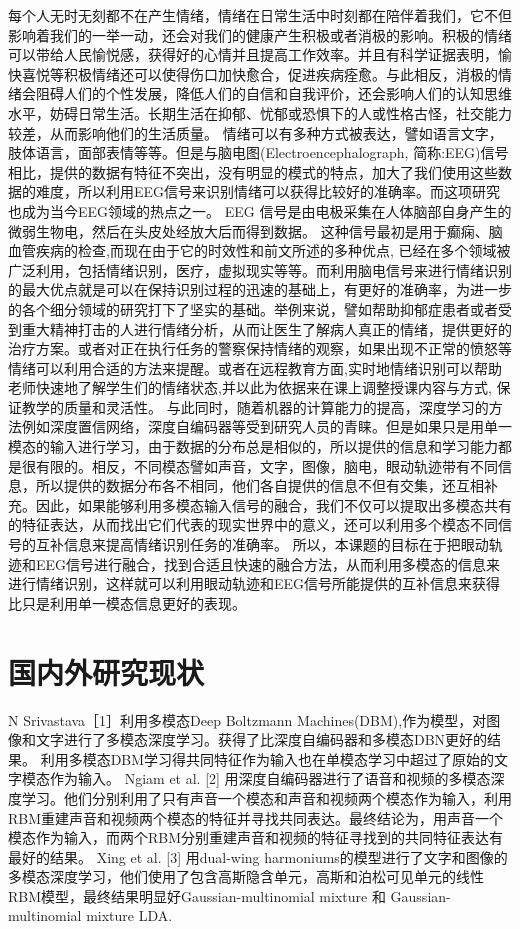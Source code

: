 	每个人无时无刻都不在产生情绪，情绪在日常生活中时刻都在陪伴着我们，它不但影响着我们的一举一动，还会对我们的健康产生积极或者消极的影响。积极的情绪可以带给人民愉悦感，获得好的心情并且提高工作效率。并且有科学证据表明，愉快喜悦等积极情绪还可以使得伤口加快愈合，促进疾病痊愈。与此相反，消极的情绪会阻碍人们的个性发展，降低人们的自信和自我评价，还会影响人们的认知思维水平，妨碍日常生活。长期生活在抑郁、忧郁或恐惧下的人或性格古怪，社交能力较差，从而影响他们的生活质量。
	情绪可以有多种方式被表达，譬如语言文字，肢体语言，面部表情等等。但是与脑电图(Electroencephalograph, 简称:EEG)信号相比，提供的数据有特征不突出，没有明显的模式的特点，加大了我们使用这些数据的难度，所以利用EEG信号来识别情绪可以获得比较好的准确率。而这项研究也成为当今EEG领域的热点之一。
	EEG 信号是由电极采集在人体脑部自身产生的微弱生物电，然后在头皮处经放大后而得到数据。 这种信号最初是用于癫痫、脑血管疾病的检查,而现在由于它的时效性和前文所述的多种优点, 已经在多个领域被广泛利用，包括情绪识别，医疗，虚拟现实等等。而利用脑电信号来进行情绪识别的最大优点就是可以在保持识别过程的迅速的基础上，有更好的准确率，为进一步的各个细分领域的研究打下了坚实的基础。举例来说，譬如帮助抑郁症患者或者受到重大精神打击的人进行情绪分析，从而让医生了解病人真正的情绪，提供更好的治疗方案。或者对正在执行任务的警察保持情绪的观察，如果出现不正常的愤怒等情绪可以利用合适的方法来提醒。或者在远程教育方面,实时地情绪识别可以帮助老师快速地了解学生们的情绪状态,并以此为依据来在课上调整授课内容与方式, 保证教学的质量和灵活性。
	与此同时，随着机器的计算能力的提高，深度学习的方法例如深度置信网络，深度自编码器等受到研究人员的青睐。但是如果只是用单一模态的输入进行学习，由于数据的分布总是相似的，所以提供的信息和学习能力都是很有限的。相反，不同模态譬如声音，文字，图像，脑电，眼动轨迹带有不同信息，所以提供的数据分布各不相同，他们各自提供的信息不但有交集，还互相补充。因此，如果能够利用多模态输入信号的融合，我们不仅可以提取出多模态共有的特征表达，从而找出它们代表的现实世界中的意义，还可以利用多个模态不同信号的互补信息来提高情绪识别任务的准确率。
	所以，本课题的目标在于把眼动轨迹和EEG信号进行融合，找到合适且快速的融合方法，从而利用多模态的信息来进行情绪识别，这样就可以利用眼动轨迹和EEG信号所能提供的互补信息来获得比只是利用单一模态信息更好的表现。
	
\section{国内外研究现状}
	 N Srivastava［1］利用多模态Deep Boltzmann Machines(DBM),作为模型，对图像和文字进行了多模态深度学习。获得了比深度自编码器和多模态DBN更好的结果。 利用多模态DBM学习得共同特征作为输入也在单模态学习中超过了原始的文字模态作为输入。
	Ngiam et al. [2] 用深度自编码器进行了语音和视频的多模态深度学习。他们分别利用了只有声音一个模态和声音和视频两个模态作为输入，利用RBM重建声音和视频两个模态的特征并寻找共同表达。最终结论为，用声音一个模态作为输入，而两个RBM分别重建声音和视频的特征寻找到的共同特征表达有最好的结果。
	Xing et al. [3] 用dual-wing harmoniums的模型进行了文字和图像的多模态深度学习，他们使用了包含高斯隐含单元，高斯和泊松可见单元的线性RBM模型，最终结果明显好Gaussian-multinomial mixture 和 Gaussian-multinomial mixture LDA.
	 
